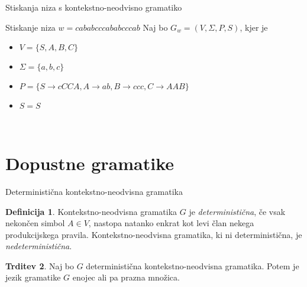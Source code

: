 \documentclass{beamer}
\theoremstyle{definition} %
\newtheorem{definicija}{Definicija}[section]
\newtheorem{trditev}[definicija]{Trditev}
\begin{document}
\begin{frame}{Stiskanja niza s kontekstno-neodvisno gramatiko}
    \begin{exampleblock}{Stiskanje niza $ w = \mathit{cababcccababcccab} $}
        Naj bo $ G_w = ( V, \Sigma, P, S ) $, kjer je 
        \begin{itemize}
            \item<2-> $ V = \{ S, A, B, C \} $
            \item<3-> $ \Sigma = \{ a, b, c \} $
            \item<4-> $ P = \{ S  \rightarrow  \mathit{cCCA}, A  \rightarrow  \mathit{ab}, B  
            \rightarrow  \mathit{ccc}, C  \rightarrow  \mathit{AAB} \} $
            \item<5-> $ S = S $
        \end{itemize}
        \pause
        \pause
        \pause
        \pause
        \pause \\
    \end{exampleblock}
\end{frame}

\section{Dopustne gramatike}

\begin{frame}{Deterministična kontekstno-neodvisna gramatika}
    \begin{definicija}
        Kontekstno-neodvisna gramatika $G$ je \textit{deterministična}, če vsak nekončen simbol $ A \in V $,
        nastopa natanko enkrat kot levi član nekega produkcijskega pravila.
        Kontekstno-neodvisna gramatika, ki ni deterministična, je \textit{nedeterministična}.
    \end{definicija}
    \pause
    \begin{trditev}
        Naj bo $G$ deterministična kontekstno-neodvisna gramatika. Potem je jezik gramatike $G$ enojec ali pa prazna množica.
    \end{trditev}
\end{frame}
\end{document}
